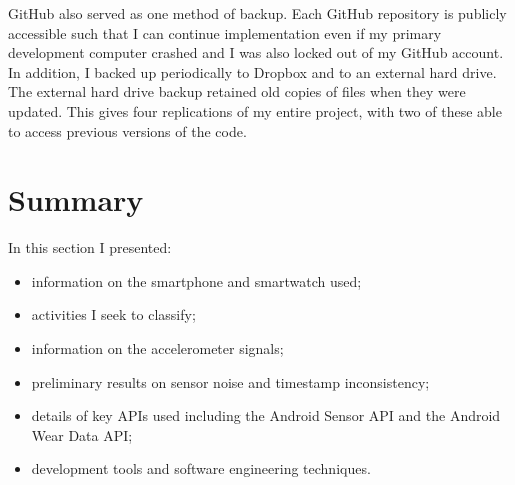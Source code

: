       GitHub also served as one method of backup. Each GitHub repository is publicly accessible such that I can continue implementation even if my primary development computer crashed and I was also locked out of my GitHub account. In addition, I backed up periodically to Dropbox and to an external hard drive. The external hard drive backup retained old copies of files when they were updated. This gives four replications of my entire project, with two of these able to access previous versions of the code.
    
  \section{Summary}
    In this section I presented:
    \begin{itemize}
      \item information on the smartphone and smartwatch used;
      \item activities I seek to classify;
      \item information on the accelerometer signals;
      \item preliminary results on sensor noise and timestamp inconsistency;
      \item details of key APIs used including the Android Sensor API and the Android Wear Data API;
      \item development tools and software engineering techniques.
    \end{itemize}
